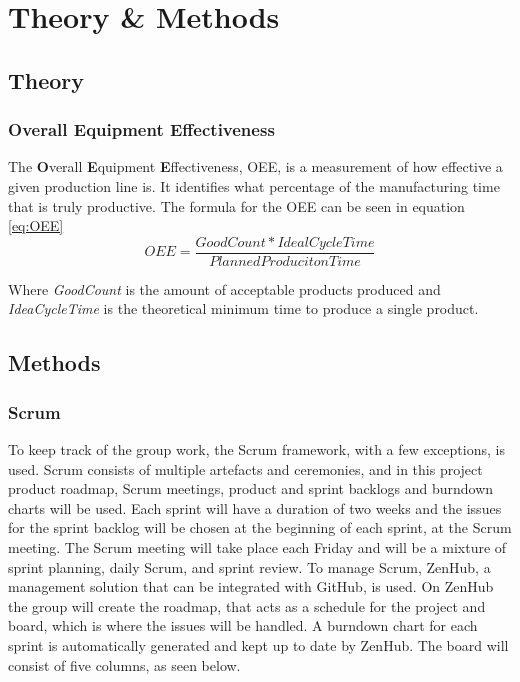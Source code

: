 \section{Theory \& Methods}
\subsection{Theory}

\subsubsection{Overall Equipment Effectiveness}
The \textbf{O}verall \textbf{E}quipment \textbf{E}ffectiveness, OEE, is a
measurement of how effective a given production line is. It identifies what
percentage of the manufacturing time that is truly productive. The formula for
the OEE can be seen in equation \ref{eq:OEE}
\begin{equation} \label{eq:OEE}
    OEE = \frac{Good Count * Ideal Cycle Time}{Planned Produciton Time}
\end{equation}

Where \textit{GoodCount} is the amount of acceptable products produced and
\textit{IdeaCycleTime} is the theoretical minimum time to produce a single
product.

\subsection{Methods}
\subsubsection{Scrum}
To keep track of the group work, the Scrum framework, with a few exceptions, is
used. Scrum consists of multiple artefacts and ceremonies, and in this project
product roadmap, Scrum meetings, product and sprint backlogs and burndown charts
will be used. Each sprint will have a duration of two weeks and the issues for
the sprint backlog will be chosen at the beginning of each sprint, at the Scrum
meeting. The Scrum meeting will take place each Friday and will be a mixture of
sprint planning, daily Scrum, and sprint review. To manage Scrum, ZenHub, a
management solution that can be integrated with GitHub, is used. On ZenHub the
group will create the roadmap, that acts as a schedule for the project and
board, which is where the issues will be handled. A burndown chart for each
sprint is automatically generated and kept up to date by ZenHub. The board will
consist of five columns, as seen below.

